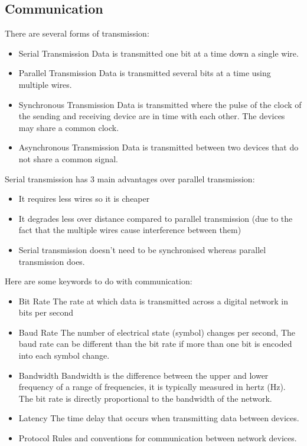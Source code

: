 \subsection{Communication}
  \noindent
  There are several forms of transmission:
  \begin{itemize}
    \setlength{\itemsep}{0em}
    \item Serial Transmission
      \subitem Data is transmitted one bit at a time down a single wire.
    \item Parallel Transmission
      \subitem Data is transmitted several bits at a time using multiple wires.
    \item Synchronous Transmission
      \subitem Data is transmitted where the pulse of the clock of the sending and receiving device are in time with each other. The devices may share a common clock.
    \item Asynchronous Transmission
      \subitem Data is transmitted between two devices that do not share a common signal.
  \end{itemize}
  Serial transmission has 3 main advantages over parallel transmission:
  \begin{itemize}
    \setlength{\itemsep}{0em}
    \item It requires less wires so it is cheaper
    \item It degrades less over distance compared to parallel transmission (due to the fact that the multiple wires cause interference between them)
    \item Serial transmission doesn't need to be synchronised whereas parallel transmission does.
  \end{itemize}
  Here are some keywords to do with communication:
  \begin{itemize}
    \setlength{\itemsep}{0em}
    \item Bit Rate
      \subitem The rate at which data is transmitted across a digital network in bits per second
    \item Baud Rate
      \subitem The number of electrical state (symbol) changes per second, The baud rate can be different than the bit rate if more than one bit is encoded into each symbol change.
    \item Bandwidth
      \subitem Bandwidth is the difference between the upper and lower frequency of a range of frequencies, it is typically measured in hertz (Hz). The bit rate is directly proportional to the bandwidth of the network.
    \item Latency
      \subitem The time delay that occurs when transmitting data between devices.
    \item Protocol
      \subitem Rules and conventions for communication between network devices.
  \end{itemize}
